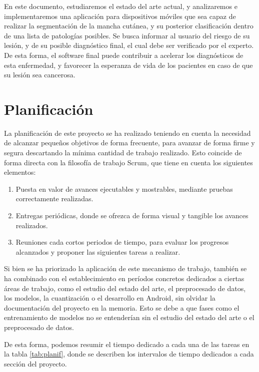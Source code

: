 En este documento, estudiaremos el estado del arte actual, y analizaremos e implementaremos una aplicación para dispositivos móviles que sea capaz de realizar la segmentación de la mancha cutánea, y su posterior clasificación dentro de una lista de patologías posibles. Se busca informar al usuario del riesgo de su lesión, y de su posible diagnóstico final, el cual debe ser verificado por el experto. De esta forma, el software final puede contribuir a acelerar los diagnósticos de esta enfermedad,  y favorecer la esperanza de vida de los pacientes en caso de que su lesión sea cancerosa.

\section{Planificación}

La planificación de este proyecto se ha realizado teniendo en cuenta la necesidad de alcanzar pequeños objetivos de forma frecuente, para avanzar de forma firme y segura descartando la mínima cantidad de trabajo realizado. Esto coincide de forma directa con la filosofía de trabajo Scrum, que tiene en cuenta los siguientes elementos:

\begin{enumerate}
	\item Puesta en valor de avances ejecutables y mostrables, mediante pruebas correctamente realizadas.
	\item Entregas periódicas, donde se ofrezca de forma visual y tangible los avances realizados.
	\item Reuniones cada cortos periodos de tiempo, para evaluar los progresos alcanzados y proponer las siguientes tareas a realizar.
\end{enumerate}

Si bien se ha priorizado la aplicación de este mecanismo de trabajo, también se ha combinado con el establecimiento en períodos concretos dedicados a ciertas áreas de trabajo, como el estudio del estado del arte, el preprocesado de datos, los modelos, la cuantización o el desarrollo en Android, sin olvidar la documentación del proyecto en la memoria. Esto se debe a que fases como el entrenamiento de modelos no se entenderían sin el estudio del estado del arte o el preprocesado de datos.

De esta forma, podemos resumir el tiempo dedicado a cada una de las tareas en la tabla \ref{tab:planif}, donde se describen los intervalos de tiempo dedicados a cada sección del proyecto.

